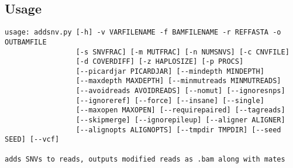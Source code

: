 \documentclass[letterpaper,11pt]{article}
\begin{document}
\subsection{Usage}
\begin{verbatim}
usage: addsnv.py [-h] -v VARFILENAME -f BAMFILENAME -r REFFASTA -o OUTBAMFILE
                 [-s SNVFRAC] [-m MUTFRAC] [-n NUMSNVS] [-c CNVFILE]
                 [-d COVERDIFF] [-z HAPLOSIZE] [-p PROCS]
                 [--picardjar PICARDJAR] [--mindepth MINDEPTH]
                 [--maxdepth MAXDEPTH] [--minmutreads MINMUTREADS]
                 [--avoidreads AVOIDREADS] [--nomut] [--ignoresnps]
                 [--ignoreref] [--force] [--insane] [--single]
                 [--maxopen MAXOPEN] [--requirepaired] [--tagreads]
                 [--skipmerge] [--ignorepileup] [--aligner ALIGNER]
                 [--alignopts ALIGNOPTS] [--tmpdir TMPDIR] [--seed SEED] [--vcf]

adds SNVs to reads, outputs modified reads as .bam along with mates


\end{verbatim}
\end{document}
